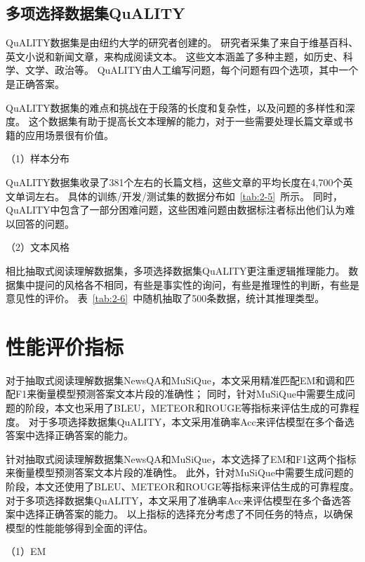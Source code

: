 \subsection{多项选择数据集QuALITY}
QuALITY数据集是由纽约大学的研究者创建的。
研究者采集了来自于维基百科、英文小说和新闻文章，来构成阅读文本。
这些文本涵盖了多种主题，如历史、科学、文学、政治等。
QuALITY由人工编写问题，每个问题有四个选项，其中一个是正确答案。

QuALITY数据集的难点和挑战在于段落的长度和复杂性，以及问题的多样性和深度。
这个数据集有助于提高长文本理解的能力，对于一些需要处理长篇文章或书籍的应用场景很有价值。

（1）样本分布

QuALITY数据集收录了381个左右的长篇文档，这些文章的平均长度在4,700个英文单词左右。
具体的训练/开发/测试集的数据分布如~\ref{tab:2-5}~所示。
同时，QuALITY中包含了一部分困难问题，这些困难问题由数据标注者标出他们认为难以回答的问题。



（2）文本风格

相比抽取式阅读理解数据集，多项选择数据集QuALITY更注重逻辑推理能力。
数据集中提问的风格各不相同，有些是事实性的询问，有些是推理性的判断，有些是意见性的评价。
表~\ref{tab:2-6}~中随机抽取了500条数据，统计其推理类型。



\section{性能评价指标}
对于抽取式阅读理解数据集NewsQA和MuSiQue，本文采用精准匹配EM和调和匹配F1来衡量模型预测答案文本片段的准确性；
同时，针对MuSiQue中需要生成问题的阶段，本文也采用了BLEU，METEOR和ROUGE等指标来评估生成的可靠程度。
对于多项选择数据集QuALITY，本文采用准确率Acc来评估模型在多个备选答案中选择正确答案的能力。

针对抽取式阅读理解数据集NewsQA和MuSiQue，本文选择了EM和F1这两个指标来衡量模型预测答案文本片段的准确性。
此外，针对MuSiQue中需要生成问题的阶段，本文还使用了BLEU、METEOR和ROUGE等指标来评估生成的可靠程度。
对于多项选择数据集QuALITY，本文采用了准确率Acc来评估模型在多个备选答案中选择正确答案的能力。
以上指标的选择充分考虑了不同任务的特点，以确保模型的性能能够得到全面的评估。

（1）EM


